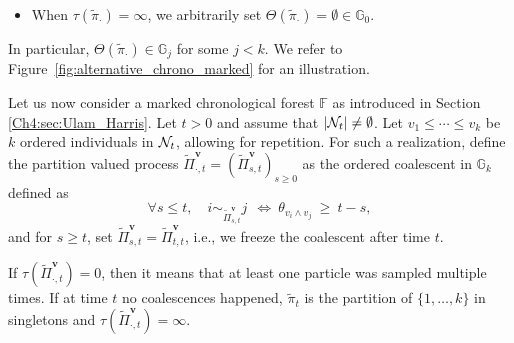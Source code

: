\begin{refsegment}
\begin{itemize}
  \item When $\tau(\tilde{\pi}_\cdot)=\infty$, we arbitrarily set $\Theta(\tilde{\pi}_\cdot)=\emptyset\in \mathbb G_0$.
\end{itemize}
  In particular, $\Theta(\tilde \pi_\cdot)\in \mathbb{G}_{j}$ for some $j<k$.
We
refer to Figure~\ref{fig:alternative_chrono_marked} for an
illustration.


\bigskip



Let us now consider a marked chronological forest $\mathbb{F}$ as introduced in Section \ref{Ch4:sec:Ulam_Harris}. Let $t>0$ and
assume that $|{\cal N}_t|\neq \emptyset$. Let 
$v_1\leq  \cdots\leq  v_{k}$ be $k$ ordered individuals in ${\cal N}_t$, allowing for repetition. 
For such a realization, 
define the partition valued process $\tilde\Pi_{\cdot,t}^{\bm{v}} = (\tilde\Pi^{\bm{v}}_{s,t})_{s \geq 0}$ as the ordered coalescent in $\mathbb{G}_k$ defined as
\begin{equation*}
\forall s\leq t, \quad
    i \sim_{\tilde\Pi^{\bm{v}}_{s,t}} j\ 
   \ \iff\ \theta_{v_i \wedge v_j}\ \geq\ t - s,
\end{equation*}
and for $s\geq t$, set $\tilde \Pi^{\bm v}_{s,t}=\tilde \Pi^{\bm v}_{t,t}$, i.e., we freeze the coalescent after time $t$. 

\begin{rem}
If $\tau(\tilde\Pi^{\bm v}_{\cdot,t})=0$, then it means that at least one particle was sampled multiple times. If at time $t$ no coalescences happened, $\tilde\pi_t$ is the partition of $\{1,\ldots,k\}$ in singletons and $\tau(\tilde\Pi^{\bm v}_{\cdot,t})=\infty$.
\end{rem}



\end{refsegment}
